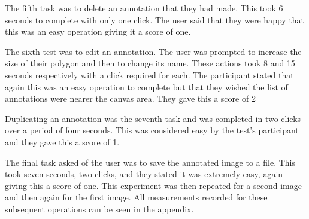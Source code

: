 The fifth task was to delete an annotation that they had made.  This took 6 seconds to complete with only one click.  The user said that they were happy that this was an easy operation giving it a score of one.

The sixth test was to edit an annotation.  The user was prompted to increase the size of their polygon and then to change its name.  These actions took 8 and 15 seconds respectively with a click required for each.  The participant stated that again this was an easy operation to complete but that they wished the list of annotations were nearer the canvas area.  They gave this a score of 2

Duplicating an annotation was the seventh task and was completed in two clicks over a period of four seconds.  This was considered easy by the test’s participant and they gave this a score of 1.

The final task asked of the user was to save the annotated image to a file.  This took seven seconds, two clicks, and they stated it was extremely easy, again giving this a score of one.  This experiment was then repeated for a second image and then again for the first image.  All measurements recorded for these subsequent operations can be seen in the appendix.
